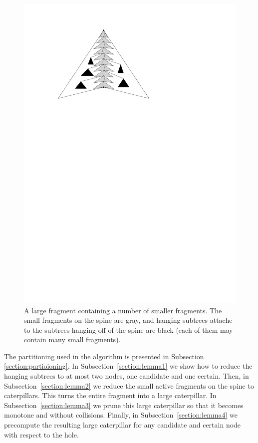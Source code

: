 \documentclass[a4paper,UKenglish]{lipics-v2016}
\theoremstyle{plain}
\begin{document}
\begin{figure}[h]
\begin{center}
\includegraphics[scale=1]{refinement}
\end{center}
\caption{A large fragment containing a number of smaller fragments. The small fragments on the spine are gray, and hanging subtrees attache to the subtrees hanging off of the spine are black (each of them may contain many small fragments). %
\label{figure of small fragments inside a large fragment}}
\end{figure}

The partitioning used in the algorithm is presented in Subsection \ref{section:partioioning}. In Subsection~\ref{section:lemma1} we show how to reduce the hanging subtrees to at most two nodes, one candidate and one certain. Then, in Subsection~\ref{section:lemma2} we reduce the small active fragments on the spine to caterpillars. This turns the entire fragment into a large caterpillar. In Subsection~\ref{section:lemma3} we prune this large caterpillar so that it becomes monotone and without collisions. Finally, in Subsection~\ref{section:lemma4} we precompute
the resulting large caterpillar for any candidate and certain node with respect to the hole.
\end{document}
